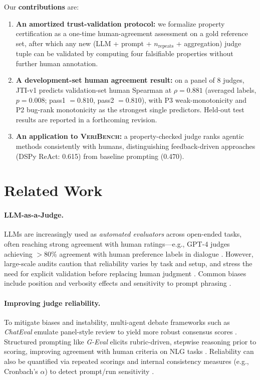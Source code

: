 \documentclass{article}
\begin{document}
Our \textbf{contributions} are:
\begin{enumerate}
  \item \textbf{An amortized trust-validation protocol:} we formalize property certification as a one-time human-agreement assessment on a gold reference set, after which any new (LLM + prompt + \(n_\text{repeats}\) + aggregation) judge tuple can be validated by computing four falsifiable properties without further human annotation.
  \item \textbf{A development-set human agreement result:} on a panel of 8 judges, JTI-v1 predicts validation-set human Spearman at \(\rho=0.881\) (averaged labels, \(p=0.008\); pass1 \(=0.810\), pass2 \(=0.810\)), with P3 weak-monotonicity and P2 bug-rank monotonicity as the strongest single predictors. Held-out test results are reported in a forthcoming revision.
  \item \textbf{An application to \textsc{VeriBench}:} a property-checked judge ranks agentic methods consistently with humans, distinguishing feedback-driven approaches (DSPy ReAct: 0.615) from baseline prompting (0.470).
\end{enumerate}

\section{Related Work}
\paragraph{LLM-as-a-Judge.}
LLMs are increasingly used as \emph{automated evaluators} across open-ended tasks, often reaching strong agreement with human ratings—e.g., GPT-4 judges achieving $>$80\% agreement with human preference labels in dialogue \citep{Zheng2023MTBench}. However, large-scale audits caution that reliability varies by task and setup, and stress the need for explicit validation before replacing human judgment \citep{Kocmi2024HumanVsLLM,Li2024TrustLLMJudgments}. Common biases include position and verbosity effects and sensitivity to prompt phrasing \citep{Zheng2023MTBench,Li2024TrustLLMJudgments}.

\paragraph{Improving judge reliability.}
To mitigate biases and instability, multi-agent debate frameworks such as \emph{ChatEval} emulate panel-style review to yield more robust consensus scores \citep{Chan2024ChatEval}. Structured prompting like \emph{G-Eval} elicits rubric-driven, stepwise reasoning prior to scoring, improving agreement with human criteria on NLG tasks \citep{Liu2023GEval}. Reliability can also be quantified via repeated scorings and internal consistency measures (e.g., Cronbach’s $\alpha$) to detect prompt/run sensitivity \citep{Li2024TrustLLMJudgments}.
\end{document}
